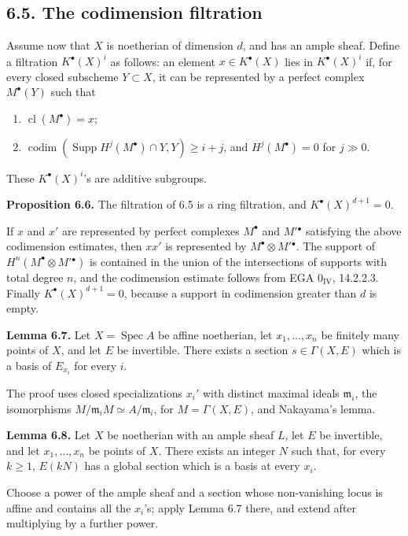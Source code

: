 \documentclass[11pt]{article}
\newcommand{\cl}{\operatorname{cl}}
\newcommand{\Spec}{\operatorname{Spec}}
\providecommand{\codim}{\operatorname{codim}}
\providecommand{\Supp}{\operatorname{Supp}}
\providecommand{\codim}{\operatorname{codim}}
\begin{document}
\subsection*{6.5. The codimension filtration}
Assume now that \(X\) is noetherian of dimension \(d\), and has an ample sheaf. Define a filtration \(K^\bullet(X)^i\) as follows: an element \(x\in K^\bullet(X)\) lies in \(K^\bullet(X)^i\) if, for every closed subscheme \(Y\subset X\), it can be represented by a perfect complex \(M^\bullet(Y)\) such that
\begin{enumerate}[label=\textup{\alph*)}]
\item \(\cl(M^\bullet)=x\);
\item \(\codim(\Supp H^j(M^\bullet)\cap Y,Y)\geq i+j\), and \(H^j(M^\bullet)=0\) for \(j\gg 0\).
\end{enumerate}
These \(K^\bullet(X)^i\)'s are additive subgroups.

\textbf{Proposition 6.6.} The filtration of 6.5 is a ring filtration, and \(K^\bullet(X)^{d+1}=0\).

If \(x\) and \(x'\) are represented by perfect complexes \(M^\bullet\) and \(M'{}^\bullet\) satisfying the above codimension estimates, then \(xx'\) is represented by \(M^\bullet\otimes M'{}^\bullet\). The support of \(H^n(M^\bullet\otimes M'{}^\bullet)\) is contained in the union of the intersections of supports with total degree \(n\), and the codimension estimate follows from EGA \(0_{\mathrm{IV}}\), 14.2.2.3. Finally \(K^\bullet(X)^{d+1}=0\), because a support in codimension greater than \(d\) is empty.

\textbf{Lemma 6.7.} Let \(X=\Spec A\) be affine noetherian, let \(x_1,\ldots,x_n\) be finitely many points of \(X\), and let \(E\) be invertible. There exists a section \(s\in \Gamma(X,E)\) which is a basis of \(E_{x_i}\) for every \(i\).

The proof uses closed specializations \(x_i'\) with distinct maximal ideals \(\mathfrak m_i\), the isomorphisms \(M/\mathfrak m_iM\simeq A/\mathfrak m_i\), for \(M=\Gamma(X,E)\), and Nakayama's lemma.

\textbf{Lemma 6.8.} Let \(X\) be noetherian with an ample sheaf \(L\), let \(E\) be invertible, and let \(x_1,\ldots,x_n\) be points of \(X\). There exists an integer \(N\) such that, for every \(k\geq1\), \(E(kN)\) has a global section which is a basis at every \(x_i\).

Choose a power of the ample sheaf and a section whose non-vanishing locus is affine and contains all the \(x_i\)'s; apply Lemma 6.7 there, and extend after multiplying by a further power.
\end{document}

